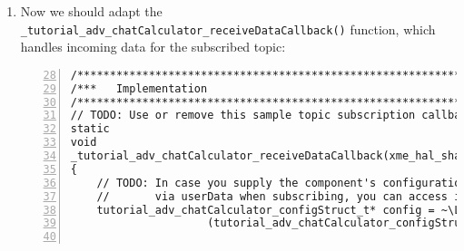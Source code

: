 \begin{enumerate}
\begin{lstlisting}[numbers=left,firstnumber=69]
xme_core_status_t
tutorial_adv_chatCalculator_create(tutorial_adv_chatCalculator_configStruct_t* config)
{
	// TODO: Initialize component state
/*	config->dummyState = 0; */               /~~/ Comment or remove this line

/*	// TODO: Add code */                    /~~/ Comment or remove this block
//	XME_LOG(XME_LOG_NOTE, "Create function of Chat Calculator called!\n");

	// Example: Publish a topic
	config->publicationHandle =
		xme_core_dcc_publishTopic
		(
			config->topic,                              /~~/ Change this line
			XME_CORE_MD_EMPTY_META_DATA,
			false,
			NULL
		);

	// Check for errors
	if (XME_CORE_DCC_INVALID_PUBLICATION_HANDLE == ~\LstSuppressNumber~
		                                         config->publicationHandle) ~\LstReactivateNumber~
	{
		return XME_CORE_STATUS_INTERNAL_ERROR;
	}

	// Example: Subscribe to a topic
	config->subscriptionHandle =
		xme_core_dcc_subscribeTopic
		(
			config->topic,                              /~~/ Change this line
			XME_CORE_MD_EMPTY_META_DATA,
			false,
			_tutorial_adv_chatCalculator_receiveDataCallback,
			config
		); ~\LstSuppressNumber~

	[...]                           /~~/ Leave the rest of the function as-is
} ~\LstReactivateNumber~
\end{lstlisting}

	\item Now we should adapt the \verb|_tutorial_adv_chatCalculator_receiveDataCallback()| function,
		which handles incoming data for the subscribed topic:

\begin{lstlisting}[numbers=left,firstnumber=28,breaklines]
/*************************************************************************/
/***   Implementation                                                  ***/
/*************************************************************************/
// TODO: Use or remove this sample topic subscription callback function:
static
void
_tutorial_adv_chatCalculator_receiveDataCallback(xme_hal_sharedPtr_t dataHandle, void* userData)
{
	// TODO: In case you supply the component's configuration instance
	//       via userData when subscribing, you can access it here:
	tutorial_adv_chatCalculator_configStruct_t* config = ~\LstSuppressNumber~
                     (tutorial_adv_chatCalculator_configStruct_t*)userData; ~\LstReactivateNumber~


\end{lstlisting}
\end{enumerate}
